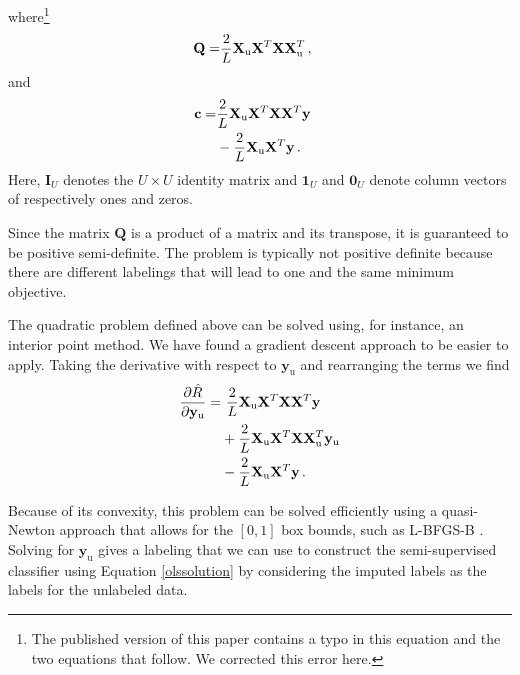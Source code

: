 \documentclass[twoside]{memoir}\usepackage[]{graphicx}\usepackage{xcolor}
\newcommand{\Xe}{\mathbf{X}_\mathrm{e}  }
\let\G\relax
\newcommand{\G}{\left(\Xe^T \Xe \right)^{-1}}
\newcommand{\Nunl}{U}
\newcommand{\Nlab}{L}
\begin{document}
where\footnote{The published version of this paper contains a typo in this equation and the two equations that follow. We corrected this error here.}
\begin{equation}
\begin{aligned}
\mathbf{Q} = & \frac{2}{\Nlab}  \mathbf{X}_\textrm{u} \G \mathbf{X}^T \mathbf{X} \G \mathbf{X}_\textrm{u}^T \,, &\\
\end{aligned} \nonumber
\end{equation}
and
\begin{equation}
\begin{aligned}
\mathbf{c} = & \frac{2}{\Nlab} \mathbf{X}_\textrm{u} \G \mathbf{X}^T \mathbf{X} \G \mathbf{X}^T \mathbf{y} & \\
& - \frac{2}{\Nlab}  \mathbf{X}_\textrm{u} \G \mathbf{X}^T  \mathbf{y} \, . &\\
\end{aligned} \nonumber
\end{equation}
Here, $\mathbf{I}_{\Nunl}$ denotes the $\Nunl \times \Nunl$ identity matrix and $\mathbf{1}_{\Nunl}$ and $\mathbf{0}_{\Nunl}$ denote column vectors of respectively ones and zeros.

Since the matrix $\mathbf{Q}$ is a product of a matrix and its transpose, it is guaranteed to be positive semi-definite. The problem is typically not positive definite because there are different labelings that will lead to one and the same minimum objective. 

The quadratic problem defined above can be solved using, for instance, an interior point method. We have found a gradient descent approach to be easier to apply. Taking the derivative with respect to $\mathbf{y}_\textrm{u}$ and rearranging the terms we find
\begin{align}
\frac { \partial \hat{R} }{ \partial \mathbf{y}_\textrm{u} } = & \ \frac{2}{\Nlab}  \mathbf{X}_\textrm{u} \G \mathbf{X}^T \mathbf{X} \G \mathbf{X}^T \mathbf{y} \nonumber  \\
& +  \frac{2}{\Nlab}  \mathbf{X}_\textrm{u} \G \mathbf{X}^T  \mathbf{X}  \G  \mathbf{X}_\textrm{u}^T \mathbf{y}_\textrm{u}  \nonumber \\
& -  \frac{2}{\Nlab}  \mathbf{X}_\textrm{u} \G \mathbf{X}^T  \mathbf{y} \, . \nonumber
\end{align}

Because of its convexity, this problem can be solved efficiently using a quasi-Newton approach that allows for the  $[0,1]$ box bounds, such as L-BFGS-B \citep{Byrd1995}. Solving for $\mathbf{y}_\textrm{u}$ gives a labeling that we can use to construct the semi-supervised classifier using Equation \eqref{olssolution} by considering the imputed labels as the labels for the unlabeled data.
\end{document}

